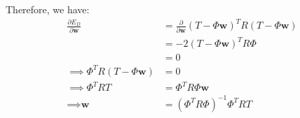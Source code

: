 \documentclass[a4paper, 11pt]{article}
\begin{document}
Therefore, we have:
    \begin{align*}
        \frac{\partial E_D}{\partial \textbf{w}} &= \frac{\partial}{\partial \textbf{w}} (T-\Phi\textbf{w})^T R (T-\Phi\textbf{w}) \\
        &= -2(T-\Phi\textbf{w})^TR\Phi \\
        &= 0 \\
        \implies \Phi^T R (T-\Phi\textbf{w}) &= 0 \\
        \implies \Phi^T R T &= \Phi^T R \Phi \textbf{w} \\
        \implies \textbf{w} &= (\Phi^T R \Phi)^{-1} \Phi^T R T
    \end{align*}

\end{document}
